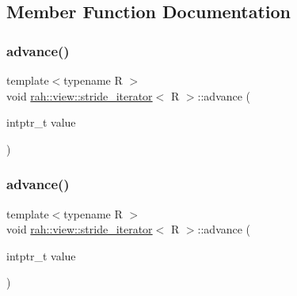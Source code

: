 \subsection{Member Function Documentation}
\mbox{\label{structrah_1_1view_1_1stride__iterator_aede4ba99f4ede1afdad678bd0dba4f7b}} 
\subsubsection{\texorpdfstring{advance()}{advance()}\hspace{0.1cm}{\footnotesize\ttfamily [1/2]}}
{\footnotesize\ttfamily template$<$typename R $>$ \\
void \mbox{\hyperlink{structrah_1_1view_1_1stride__iterator}{rah\+::view\+::stride\+\_\+iterator}}$<$ R $>$\+::advance (\begin{DoxyParamCaption}\item[{intptr\+\_\+t}]{value }\end{DoxyParamCaption})\hspace{0.3cm}{\ttfamily [inline]}}

\mbox{\label{structrah_1_1view_1_1stride__iterator_aede4ba99f4ede1afdad678bd0dba4f7b}} 
\subsubsection{\texorpdfstring{advance()}{advance()}\hspace{0.1cm}{\footnotesize\ttfamily [2/2]}}
{\footnotesize\ttfamily template$<$typename R $>$ \\
void \mbox{\hyperlink{structrah_1_1view_1_1stride__iterator}{rah\+::view\+::stride\+\_\+iterator}}$<$ R $>$\+::advance (\begin{DoxyParamCaption}\item[{intptr\+\_\+t}]{value }\end{DoxyParamCaption})\hspace{0.3cm}{\ttfamily [inline]}}

